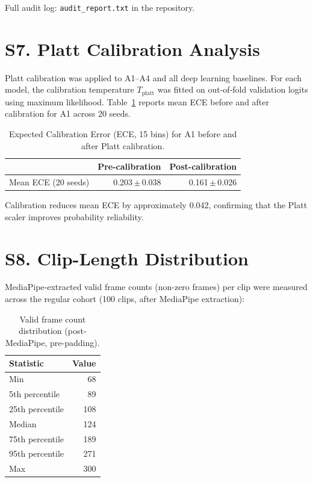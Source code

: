 \documentclass[12pt,a4paper]{article}
\begin{document}
Full audit log: \texttt{audit\_report.txt} in the repository.



\section{S7. Platt Calibration Analysis}
\label{sec:s7}

Platt calibration was applied to A1--A4 and all deep learning baselines.
For each model, the calibration temperature $T_\text{platt}$ was fitted on
out-of-fold validation logits using maximum likelihood.
Table~\ref{tab:calibration} reports mean ECE before and after calibration
for A1 across 20 seeds.

\begin{table}[H]
\centering
\caption{Expected Calibration Error (ECE, 15 bins) for A1 before and after
Platt calibration.}
\label{tab:calibration}
\begin{tabular}{@{}l r r@{}}
\toprule
& Pre-calibration & Post-calibration \\
\midrule
Mean ECE (20 seeds) & 0.203\,$\pm$\,0.038 & 0.161\,$\pm$\,0.026 \\
\bottomrule
\end{tabular}
\end{table}

Calibration reduces mean ECE by approximately 0.042, confirming that the
Platt scaler improves probability reliability.

\section{S8. Clip-Length Distribution}
\label{sec:s8}


MediaPipe-extracted valid frame counts (non-zero frames) per clip were measured
across the regular cohort (100 clips, after MediaPipe extraction):

\begin{table}[H]
\centering
\caption{Valid frame count distribution (post-MediaPipe, pre-padding).}
\begin{tabular}{@{}l r@{}}
\toprule
Statistic & Value \\
\midrule
Min & 68 \\
5th percentile & 89 \\
25th percentile & 108 \\
Median & 124 \\
75th percentile & 189 \\
95th percentile & 271 \\
Max & 300 \\
\bottomrule
\end{tabular}
\end{table}
\end{document}
